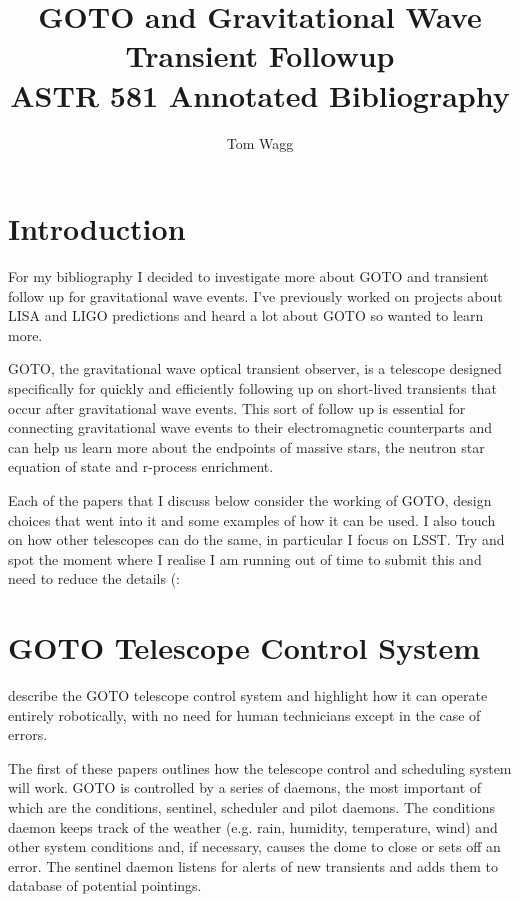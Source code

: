 \documentclass[twocolumn]{aastex631}
\begin{document}
\title{{\Large GOTO and Gravitational Wave Transient Followup}\\\vspace{0.15cm}ASTR 581 Annotated Bibliography}

\newcommand{\UW}{Department of Astronomy, University of Washington, Seattle, WA, 98195}

\author[0000-0001-6147-5761]{Tom Wagg}

\section{Introduction}
For my bibliography I decided to investigate more about GOTO and transient follow up for gravitational wave events. I've previously worked on projects about LISA and LIGO predictions and heard a lot about GOTO so wanted to learn more.

GOTO, the gravitational wave optical transient observer, is a telescope designed specifically for quickly and efficiently following up on short-lived transients that occur after gravitational wave events. This sort of follow up is essential for connecting gravitational wave events to their electromagnetic counterparts and can help us learn more about the endpoints of massive stars, the neutron star equation of state and r-process enrichment.

Each of the papers that I discuss below consider the working of GOTO, design choices that went into it and some examples of how it can be used. I also touch on how other telescopes can do the same, in particular I focus on LSST. Try and spot the moment where I realise I am running out of time to submit this and need to reduce the details (:

\section{GOTO Telescope Control System}
\citet{Dyer+2018,Dyer+2020} describe the GOTO telescope control system and highlight how it can operate entirely robotically, with no need for human technicians except in the case of errors.

The first of these papers \citep{Dyer+2018} outlines how the telescope control and scheduling system will work. GOTO is controlled by a series of daemons, the most important of which are the conditions, sentinel, scheduler and pilot daemons. The conditions daemon keeps track of the weather (e.g. rain, humidity, temperature, wind) and other system conditions and, if necessary, causes the dome to close or sets off an error. The sentinel daemon listens for alerts of new transients and adds them to database of potential pointings.
\end{document}
